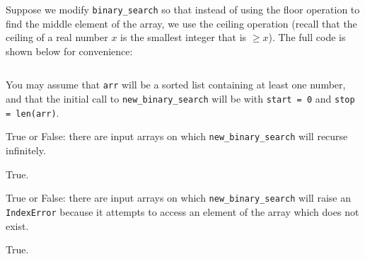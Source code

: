 \begin{prob}

    Suppose we modify \texttt{binary_search} so that instead of using the floor operation
    to find the middle element of the array, we use the ceiling operation (recall that the
    ceiling of a real number $x$ is the smallest integer that is $\geq x$). The full code is
    shown below for convenience:

    \inputminted{python}{./code.py}

    You may assume that \texttt{arr} will be a sorted list containing at least
    one number, and that the initial call to \texttt{new_binary_search} will be
    with \texttt{start = 0} and \texttt{stop = len(arr)}.

    \begin{subprobset}

        \begin{subprob}

            True or False:
            there are input arrays on which
            \texttt{new_binary_search} will recurse infinitely.

            \Tf{}

            \begin{soln}
                True.
            \end{soln}

        \end{subprob}

        \begin{subprob}

            True or False: there are input arrays on which
            \texttt{new_binary_search} will raise an \texttt{IndexError}
            because it attempts to access an element of the array which does
            not exist.

            \Tf{}

            \begin{soln}
                True.
            \end{soln}

        \end{subprob}

    \end{subprobset}

\end{prob}
